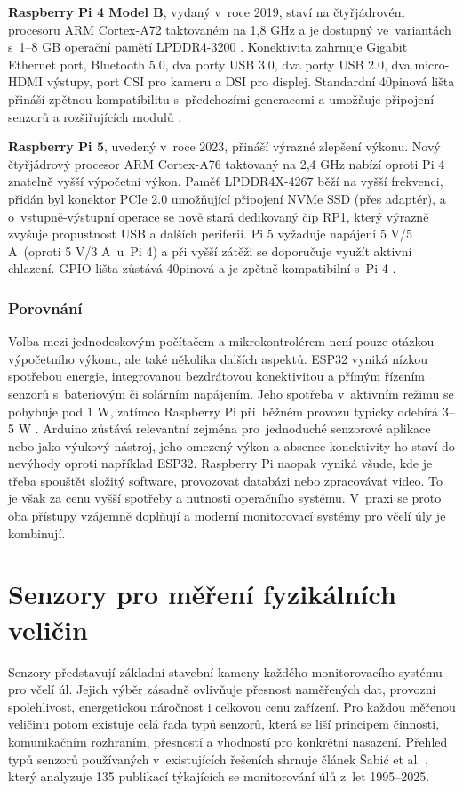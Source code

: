 \textbf{Raspberry Pi 4 Model B}, vydaný v~roce 2019, staví na čtyřjádrovém procesoru ARM Cortex-A72 taktovaném na 1,8 GHz a je dostupný ve~variantách s~1--8 GB operační pamětí LPDDR4-3200 \cite{RPi4ProductPage}. Konektivita zahrnuje Gigabit Ethernet port, Bluetooth 5.0, dva porty USB 3.0, dva porty USB 2.0, dva micro-HDMI výstupy, port CSI pro kameru a DSI pro displej. Standardní 40pinová lišta přináší zpětnou kompatibilitu s~předchozími generacemi a umožňuje připojení senzorů a rozšiřujících modulů \cite{RPi4Datasheet}.

\textbf{Raspberry Pi 5}, uvedený v~roce 2023, přináší výrazné zlepšení výkonu. Nový čtyřjádrový procesor ARM Cortex-A76 taktovaný na 2,4 GHz nabízí oproti Pi 4 znatelně vyšší výpočetní výkon. Paměť LPDDR4X-4267 běží na vyšší frekvenci, přidán byl konektor PCIe 2.0 umožňující připojení NVMe SSD (přes adaptér), a o~vstupně-výstupní operace se nově stará dedikovaný čip RP1, který výrazně zvyšuje propustnost USB a dalších periferií. Pi 5 vyžaduje napájení 5 V/5 A~(oproti 5 V/3 A~u~Pi 4) a při vyšší zátěži se doporučuje využít aktivní chlazení. GPIO lišta zůstává 40pinová a je zpětně kompatibilní s~Pi 4 \cite{Kitronik}.

\subsubsection*{Porovnání}
Volba mezi jednodeskovým počítačem a mikrokontrolérem není pouze otázkou výpočetního výkonu, ale také několika dalších aspektů. ESP32 vyniká nízkou spotřebou energie, integrovanou bezdrátovou konektivitou a přímým řízením senzorů s~bateriovým či solárním napájením. Jeho spotřeba v~aktivním režimu se pohybuje pod 1 W, zatímco Raspberry Pi při~běžném provozu typicky odebírá 3--5 W \cite{Serepas2025}. Arduino zůstává relevantní zejména pro~jednoduché senzorové aplikace nebo jako výukový nástroj, jeho omezený výkon a absence konektivity ho staví do nevýhody oproti například ESP32. Raspberry Pi naopak vyniká všude, kde je třeba spouštět složitý software, provozovat databázi nebo zpracovávat video. To je však za cenu vyšší spotřeby a nutnosti operačního systému. V~praxi se proto oba přístupy vzájemně doplňují a moderní monitorovací systémy pro včelí úly je kombinují.

\section{Senzory pro měření fyzikálních veličin}
Senzory představují základní stavební kameny každého monitorovacího systému pro včelí úl. Jejich výběr zásadně ovlivňuje přesnost naměřených dat, provozní spolehlivost, energetickou náročnost i celkovou cenu zařízení. Pro každou měřenou veličinu potom existuje celá řada typů senzorů, která se liší principem činnosti, komunikačním rozhraním, přesností a vhodností pro konkrétní nasazení. Přehled typů senzorů používaných v~existujících řešeních shrnuje článek Šabić et al. \cite{Sabic2025}, který analyzuje 135 publikací týkajících se monitorování úlů z~let 1995--2025.

